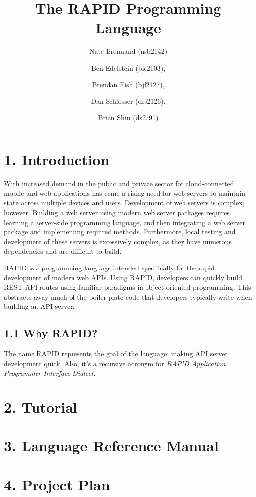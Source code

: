 \documentclass[11pt]{article}
\author{
  Nate Brennand (nsb2142)
  \and Ben Edelstein (bie2103),
  \and Brendan Fish (bjf2127),
  \and Dan Schlosser (drs2126),
  \and Brian Shin (ds2791)
}
\title{The RAPID Programming Language}
\begin{document}
\setlength{\parskip}{.1 in}

\maketitle
\newpage

\section*{1. Introduction}

With increased demand in the public and private sector for cloud-connected mobile and web applications has come a rising need for web servers to maintain state across multiple devices and users.
Development of web servers is complex, however. Building a web server using modern web server packages requires learning a server-side programming language, and then integrating a web server package and implementing required methods.
Furthermore, local testing and development of these servers is excessively complex, as they have numerous dependencies and are difficult to build.

RAPID is a programming language intended specifically for the rapid development of modern web APIs. Using RAPID, developers can quickly build REST API routes using familiar paradigms in object oriented programming. This abstracts away much of the boiler plate code that developers typically write when building an API server.


\subsection{1.1 Why RAPID?}

The name RAPID represents the goal of the language: making API server development quick.
Also, it's a recursive acronym for \textit{RAPID Application Programmer Interface Dialect}.



\section*{2. Tutorial}

\newpage

\section*{3. Language Reference Manual}

\newpage

\section*{4. Project Plan}

\newpage
\end{document}
